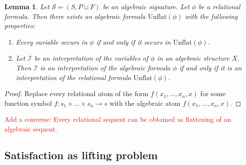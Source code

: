 \documentclass[a4paper]{article}
\newcommand{\todo}[1]{\textcolor{red}{#1}}
\newtheorem{lemma}[theorem]{Lemma}
\theoremstyle{remark}
\theoremstyle{definition}
\begin{document}
\begin{lemma}
  \label{lem:unflatten}
  Let $\mathcal{S} = (S, P \sqcup F)$ be an algebraic signature.
  Let $\phi$ be a relational formula.
  Then there exists an algebraic formula $\mathrm{Unflat}(\phi)$ with the following properties:
  \begin{enumerate}
    \item
      Every variable occurs in $\phi$ if and only if it occurs in $\mathrm{Unflat}(\phi)$.
    \item
      Let $\mathcal{I}$ be an interpretation of the variables of $\phi$ in an algebraic structure $X$.
      Then $\mathcal{I}$ is an interpretation of the algebraic formula $\phi$ if and only if it is an interpretation of the relational formula $\mathrm{Unflat}(\phi)$.
  \end{enumerate}
\end{lemma}
\begin{proof}
  Replace every relational atom of the form $f(x_1, \dots, x_n, x)$ for some function symbol $f : s_1 \times \dots \times s_n \rightarrow s$ with the algebraic atom $f(x_1, \dots, x_n, x)$.
\end{proof}

\todo{
  Add a converse:
  Every relational sequent can be obtained as flattening of an algebraic sequent.
}

\subsection{Satisfaction as lifting problem}
\end{document}
